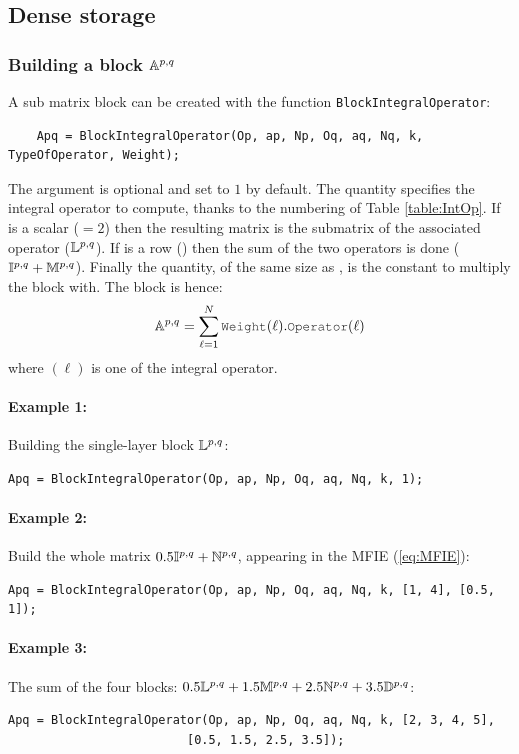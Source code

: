 \subsection{Dense storage}
\subsubsection{Building a block $\mathbb{A}^{p,q}$}

A sub matrix block can be created with the function \texttt{BlockIntegralOperator}:
\begin{lstlisting}
	Apq = BlockIntegralOperator(Op, ap, Np, Oq, aq, Nq, k, TypeOfOperator, Weight);
\end{lstlisting}
The  argument is optional and set to $1$ by default. The quantity  specifies the integral operator to compute, thanks to the numbering of Table \ref{table:IntOp}. If  is a scalar (\eg $=2$) then the resulting matrix  is the submatrix of the associated operator (\eg $\mathbb{L}^{p,q}$). If  is a row (\eg \code{[1,3]}) then the sum of the two operators is done (\eg $\mathbb{I}^{p,q}+\mathbb{M}^{p,q}$). Finally the  quantity, of the same size as , is the constant to multiply the block with. The block is hence:
$$
\Abpq = \sum_{\ell=1}^{N}\code{Weight}(\ell).\code{Operator}(\ell)
$$
where $(\ell)$ is one of the integral operator.

\paragraph{Example 1:} Building the single-layer block $\mathbb{L}^{p,q}$:
\begin{lstlisting}
Apq = BlockIntegralOperator(Op, ap, Np, Oq, aq, Nq, k, 1);
\end{lstlisting}
\paragraph{Example 2:} Build the whole matrix $0.5\mathbb{I}^{p,q} + \mathbb{N}^{p,q}$, appearing in the MFIE (\ref{eq:MFIE}):
\begin{lstlisting}
Apq = BlockIntegralOperator(Op, ap, Np, Oq, aq, Nq, k, [1, 4], [0.5, 1]);
\end{lstlisting}
\paragraph{Example 3:} The sum of the four blocks: $0.5\mathbb{L}^{p,q} + 1.5\mathbb{M}^{p,q} + 2.5\mathbb{N}^{p,q} + 3.5\mathbb{D}^{p,q}$:
\begin{lstlisting}
Apq = BlockIntegralOperator(Op, ap, Np, Oq, aq, Nq, k, [2, 3, 4, 5], 
                         [0.5, 1.5, 2.5, 3.5]);
\end{lstlisting}


